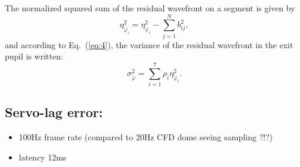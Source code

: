 \documentclass{gmto}
\begin{document}
The normalized squared sum of the residual wavefront on a segment is given by
\begin{equation}
  \label{eq:8}
  \eta_{\tilde\varphi_i}^2 = \eta_{\varphi_i}^2 - \sum_{j=1}^N b_{ij}^2,  
\end{equation}
and according to Eq.~(\ref{eq:4}), the variance of the residual wavefront in the
exit pupil is written:
\begin{equation}
  \label{eq:9}
  \sigma_{\tilde\varphi}^2 = \sum_{i=1}^7 \rho_i  \eta_{\tilde\varphi_i}^2.    
\end{equation}

\subsection{Servo-lag error:}
\label{sec:serv-lag}

\begin{itemize}
\item 100Hz frame rate (compared to 20Hz CFD dome seeing sampling ?!?)
\item latency 12ms
\end{itemize}



\printbibliography
\end{document}
